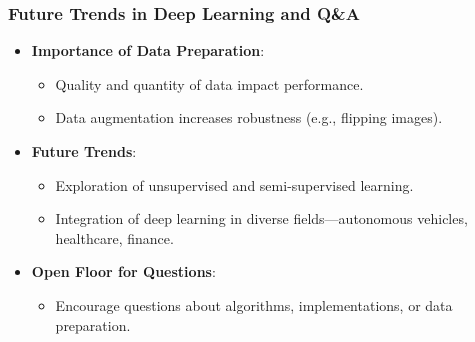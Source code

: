 \documentclass[aspectratio=169]{beamer}
\begin{document}
\begin{frame}[fragile]
    \frametitle{Future Trends in Deep Learning and Q\&A}
    
    \begin{itemize}
        \item \textbf{Importance of Data Preparation}:
        \begin{itemize}
            \item Quality and quantity of data impact performance.
            \item Data augmentation increases robustness (e.g., flipping images).
        \end{itemize}

        \item \textbf{Future Trends}:
        \begin{itemize}
            \item Exploration of unsupervised and semi-supervised learning.
            \item Integration of deep learning in diverse fields—autonomous vehicles, healthcare, finance.
        \end{itemize}
        
        \item \textbf{Open Floor for Questions}:
        \begin{itemize}
            \item Encourage questions about algorithms, implementations, or data preparation.
        \end{itemize}
    \end{itemize}
\end{frame}
\end{document}
